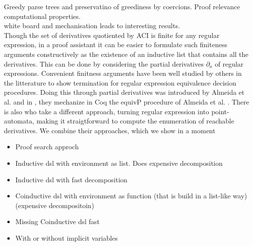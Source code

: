 \documentclass[a4paper,UKenglish,cleveref, autoref, thm-restate]{lipics-v2021}
\newcommand\mycomment[1]{}
\begin{document}
Greedy parse trees and preservatino of greediness by coercions. Proof relevance computational properties.\\
white board and mechanisation leads to interesting results.
\\
Though the set of derivatives quotiented by ACI is finite for any regular expression, in a proof assistant it can be easier to formulate such finiteness arguments constructively as the existence of an inductive list that contains all the derivatives. This can be done by considering the partial derivatives $\partial_a$ of regular expressions. Convenient finitness arguments have been well studied by others in the litterature to show termination for regular expression equivalence decision procedures. Doing this through partial derivatives was introduced by Almeida et al. \cite{AMR09} and in \cite{MPS12}, they mechanize in Coq the \textsf{equivP} procedure of Almeida et al. \mycomment{How does their termination argument work?}. There is also \cite{A12} who take a different approach, turning regular expression into point-automata, making it straigtforward to compute the enumeration of reachable derivatives. We combine their approaches, which we show in a moment
\mycomment{Two files for this, extensional and extensionalpartial which one is correct I think extensional partial, clean up code later}\\
\begin{itemize}
\item Proof search approch
\item Inductive dsl with environment as list. Does expensive decomposition
\item Inductive dsl with fast decomposition
\item Coinductive dsl with environment as function (that is build in a list-like way) (expensive decompositoin)
\item Missing Coinductive dsl fast
\item With or without implicit variables
\end{itemize}
  
\end{document}
